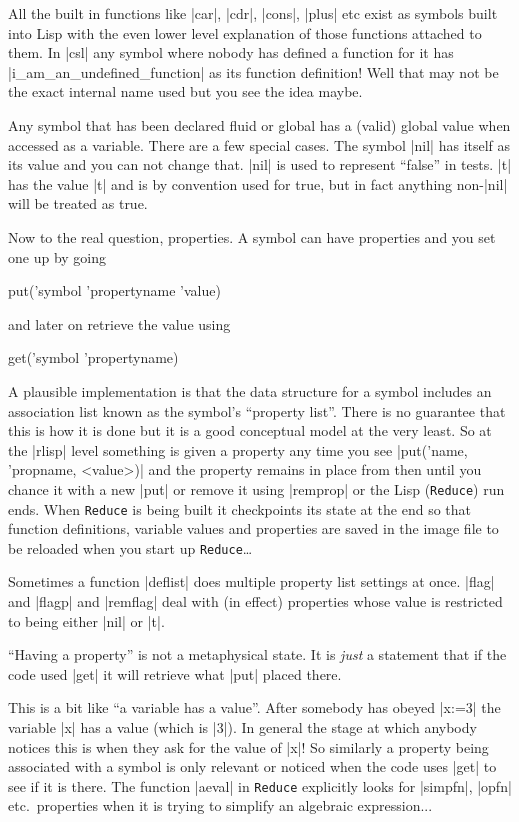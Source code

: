 \documentclass[12pt,twoside,openright]{memoir}
\newcommand{\reduce}{\texttt{Reduce}\xspace}
\begin{document}
All the built in functions like |car|, |cdr|, |cons|, |plus| etc exist as
symbols built into Lisp with the even lower level explanation of those
functions attached to them. In |csl| any symbol where nobody has defined a
function for it has |i_am_an_undefined_function| as its function definition!
Well that may not be the exact internal name used but you see the idea maybe.

Any symbol that has been declared fluid or global has a (valid) global value
when accessed as a variable. There are a few special cases. The symbol |nil|
has itself as its value and you can not change that. |nil| is used to represent
``false'' in tests. |t| has the value |t| and is by convention used for true,
but in fact anything non-|nil| will be treated as true.

Now to the real question, properties. A symbol can have properties and you set
one up by going
\begin{rlispverb}
  put('symbol 'propertyname 'value)
\end{rlispverb}
and later on retrieve the value using
\begin{rlispverb}
  get('symbol 'propertyname)
\end{rlispverb}
A plausible implementation is that the data structure for a symbol includes
an association list known as the symbol's ``property list''. There is no
guarantee that this is how it is done but it is a good conceptual model at the
very least.  So at the |rlisp| level something is given a property any time you
see |put('name, 'propname, <value>)| and the property remains in place from then
until you chance it with a new |put| or remove it using |remprop| or the Lisp
(\reduce) run ends. When \reduce is being built it checkpoints its state at the
end so that function definitions, variable values and properties are saved in
the image file to be reloaded when you start up \reduce\dots

Sometimes a function |deflist| does multiple property list settings at
once. |flag| and |flagp| and |remflag| deal with (in effect) properties whose
value is restricted to being either |nil| or |t|.

``Having a property'' is not a metaphysical state. It is {\em just} a statement
that if the code used |get| it will retrieve what |put| placed there.

This is a bit like ``a variable has a value''. After somebody has obeyed
|x:=3| the variable |x| has a value (which is |3|).
In general the stage at which
anybody notices this is when they ask for the value of |x|! So similarly a
property being associated with a symbol is only relevant or noticed when the
code uses |get| to see if it is there. The function |aeval| in \reduce
explicitly looks for |simpfn|, |opfn| etc.\ properties when it is trying to
simplify an algebraic expression...
\end{document}

